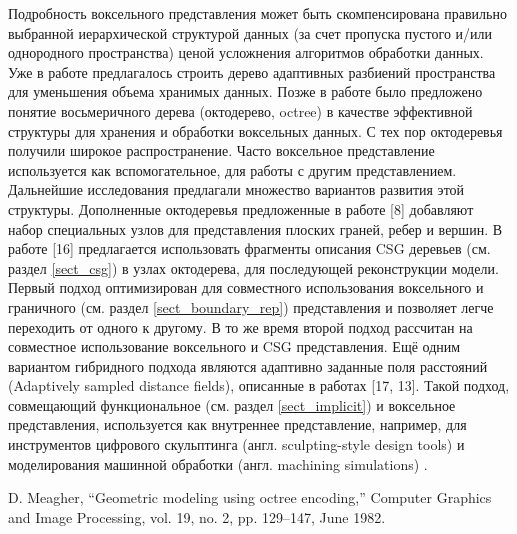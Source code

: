 Подробность воксельного представления может быть скомпенсирована правильно выбранной иерархической структурой данных (за счет пропуска пустого и/или однородного пространства) ценой усложнения алгоритмов обработки данных. Уже в работе \cite{REDD78} предлагалось строить дерево адаптивных разбиений пространства для уменьшения объема хранимых данных. Позже в работе \cite{Meagher82} было предложено понятие восьмеричного дерева (октодерево, octree) в качестве эффективной структуры для хранения и обработки воксельных данных. С тех пор октодеревья получили широкое распространение. Часто воксельное представление используется как вспомогательное, для работы с другим представлением. Дальнейшие исследования предлагали множество вариантов развития этой структуры. Дополненные октодеревья предложенные в работе [8] добавляют набор специальных узлов для представления плоских граней, ребер и вершин. В работе [16] предлагается использовать фрагменты описания CSG деревьев (см. раздел \ref{sect_csg}) в узлах октодерева, для последующей реконструкции модели. Первый подход оптимизирован для совместного использования воксельного и граничного (см. раздел \ref{sect_boundary_rep}) представления и позволяет легче переходить от одного к другому. В то же время второй подход рассчитан на совместное использование воксельного и CSG представления. Ещё одним вариантом гибридного подхода являются адаптивно заданные поля расстояний (Adaptively sampled distance fields), описанные в работах [17, 13]. Такой подход, совмещающий функциональное (см. раздел \ref{sect_implicit}) и воксельное представления, используется как внутреннее представление, например, для инструментов цифрового скульптинга (англ. sculpting-style design tools) \todo{[43]} и моделирования машинной обработки (англ. machining simulations) \todo{[46]}.

D. Meagher, “Geometric modeling using octree encoding,” Computer Graphics
and Image Processing, vol. 19, no. 2, pp. 129–147, June 1982.

